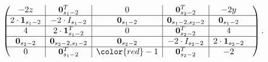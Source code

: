 \documentclass[10pt,reqno]{amsart}
\newcommand{\rvline}{\hspace*{-\arraycolsep}\vline\hspace*{-\arraycolsep}}
\def\onesvector{\mathbf{1}}
\def\zerovector{\mathbf{0}}
\begin{document}
\begin{enumerate}
\begin{equation*} 
\begin{pmatrix}
-2z & \rvline & \zerovector^T_{s_1-2}  & \rvline &  0&\rvline &\zerovector^T_{s_2-2}  &\rvline&-2y\\
\hline
2\cdot\onesvector_{s_1-2} & \rvline & -2 \cdot I_{s_1-2} & \rvline & \zerovector_{s_1-2}&\rvline & \zerovector_{s_1-2,s_2-2}&\rvline &\zerovector_{s_1-2}\\
\hline
4  & \rvline & 2 \cdot \onesvector^T_{s_1-2} & \rvline & 0& \rvline & \zerovector^T_{s_2-2}   & \rvline &4\\
\hline
 \zerovector_{s_2-2} & \rvline & \zerovector_{s_2-2,s_1-2}& \rvline &\zerovector_{s_2-2} &\rvline & -2 \cdot I_{s_2-2}& \rvline &2\cdot\onesvector_{s_2-2}\\
\hline
0 & \rvline & \zerovector^T_{s_1-2}  & \rvline &{\color{red}-1}&\rvline &  \zerovector^T_{s_2-2}&\rvline & -2 &\\
\end{pmatrix}.
\end{equation*}


\end{enumerate}
\end{document}
